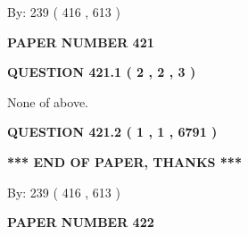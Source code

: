 \documentclass[12pt]{article}
\begin{document}
   
\hspace{1.0in} By: 
 239 ( 416 ,  613 )
   
   
   
   
\newpage 
\setcounter{page}{ 
   421001 } 
   
   
   
   
 {\textbf{ \Large{ PAPER NUMBER  421  }}}
   
   
\vspace{0.2in}
   
   
   
   
   
   
 \vspace{0.2in}
 
 
 
 
   
   
  
\vspace{0.2in}
  
{\textbf{\Large{QUESTION
421.1 
 ( 2 , 2 , 3 )
}}}
  
  
 
 
\noindent{}
 
 
 None of above.
 
 
 
 
  
\vspace{0.2in}
  
{\textbf{\Large{QUESTION
421.2 
 ( 1 , 1 , 6791 )
}}}
  
  
   
   
 \vspace{0.2in}
 
   
   
   
   
\vspace{1.0in} 
{\textbf{\large{ *** END OF PAPER, THANKS *** }}} 
   
   
\hspace{1.0in} By: 
 239 ( 416 ,  613 )
   
   
   
   
\newpage 
\setcounter{page}{ 
   422001 } 
   
   
   
   
 {\textbf{ \Large{ PAPER NUMBER  422  }}}
   
   
\vspace{0.2in}
   
\end{document}
